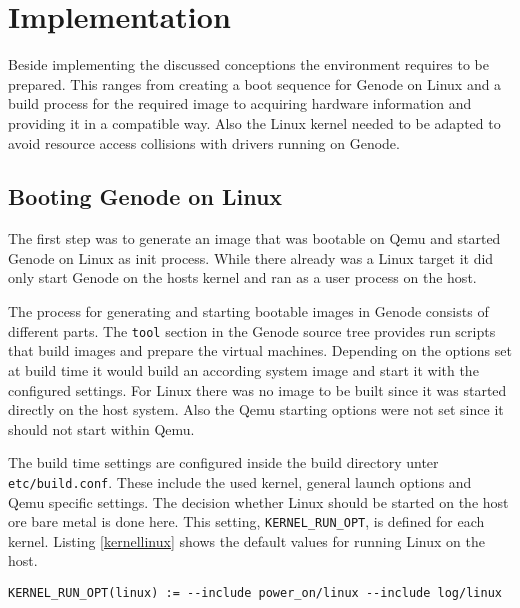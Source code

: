 \documentclass[
a4paper,
12pt,
notitlepage,
parskip=half,
DIV=11,
]{scrbook}
\begin{document}
	\chapter{Implementation}
		
		Beside implementing the discussed conceptions the environment requires to be prepared.
		This ranges from creating a boot sequence for Genode on Linux and a build process for the required image to acquiring hardware information and providing it in a compatible way.
		Also the Linux kernel needed to be adapted to avoid resource access collisions with drivers running on Genode.
		
		\section{Booting Genode on Linux}
		\label{init}
		
		The first step was to generate an image that was bootable on Qemu and started Genode on Linux as init process.
		While there already was a Linux target it did only start Genode on the hosts kernel and ran as a user process on the host.
		
		The process for generating and starting bootable images in Genode consists of different parts.
		The \texttt{tool} section in the Genode source tree provides run scripts that build images and prepare the virtual machines.
		Depending on the options set at build time it would build an according system image and start it with the configured settings.
		For Linux there was no image to be built since it was started directly on the host system.
		Also the Qemu starting options were not set since it should not start within Qemu. \citep{genode}
		
		The build time settings are configured inside the build directory unter \texttt{etc/build.conf}.
		These include the used kernel, general launch options and Qemu specific settings.
		The decision whether Linux should be started on the host ore bare metal is done here.
		This setting, \texttt{KERNEL\_RUN\_OPT}, is defined for each kernel.
		Listing \ref{kernellinux} shows the default values for running Linux on the host.
		
		\begin{lstlisting}[basicstyle=\ttfamily\footnotesize]
KERNEL_RUN_OPT(linux) := --include power_on/linux --include log/linux
		\end{lstlisting}
		
\end{document}

